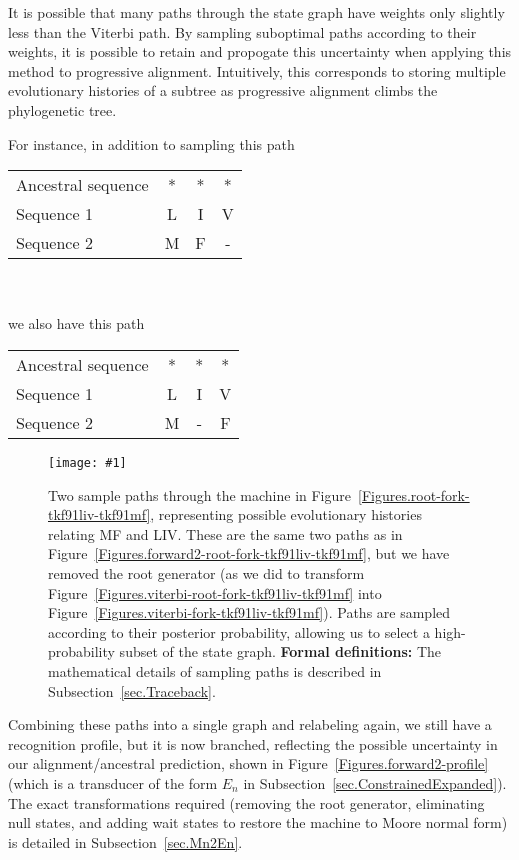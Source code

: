 \documentclass{article}
\newcommand{\secref}[1]{Subsection~\ref{sec.#1}}
\newcommand{\figref}[1]{Figure~\ref{Figures.#1}}
\newcommand{\figlabel}[1]{\label{Figures.#1}}
\newcommand{\easyfig}[4]{
\begin{figure}
\texttt{[image: \#1]}
\caption{ \figlabel{#3} #4}
\end{figure}}
\newcommand{\widepdffig}[2]{\easyfig{#1-fig.pdf}{width=\textwidth}{#1}{#2}}
\newcommand\formaldefs{{\bf Formal definitions: }}
\begin{document}
It is possible that many paths through the state graph have weights only slightly less than the 
Viterbi path.
By sampling suboptimal paths according to their weights, it is possible to retain and 
propogate  this uncertainty when applying this method to progressive alignment. 
Intuitively, this corresponds to storing multiple evolutionary histories of a subtree
as  progressive alignment climbs the phylogenetic tree.  

\noindent For instance, in addition to sampling this path

\begin{tabular}{lccc}
Ancestral sequence & * & * & * \\
Sequence 1         & L & I & V \\
Sequence 2         & M & F & -
\end{tabular}
\\ \\ 
we also have this path

\begin{tabular}{lccc}
Ancestral sequence & * & * & * \\
Sequence 1         & L & I & V \\
Sequence 2         & M & - & F
\end{tabular}

\widepdffig{forward2-fork-tkf91liv-tkf91mf}{Two sample paths through the 
machine in \figref{root-fork-tkf91liv-tkf91mf}, representing
possible evolutionary histories relating MF and LIV.
These are the same two paths as in \figref{forward2-root-fork-tkf91liv-tkf91mf},
but we have removed the root generator (as we did to transform \figref{viterbi-root-fork-tkf91liv-tkf91mf} into \figref{viterbi-fork-tkf91liv-tkf91mf}).
Paths are sampled according to their posterior probability, 
allowing us to select a high-probability subset of the state graph.  
\formaldefs
The mathematical details of sampling paths is described in \secref{Traceback}.}

Combining these paths into a single graph and relabeling again, 
we still have a recognition profile, but it is now branched,
reflecting the possible uncertainty in our alignment/ancestral prediction, shown in \figref{forward2-profile}
(which is a transducer of the form $E_n$ in \secref{ConstrainedExpanded}).
The exact transformations required (removing the root generator, eliminating null states, and adding wait states to restore the machine to Moore normal form)
is detailed in \secref{Mn2En}.  
\end{document}

